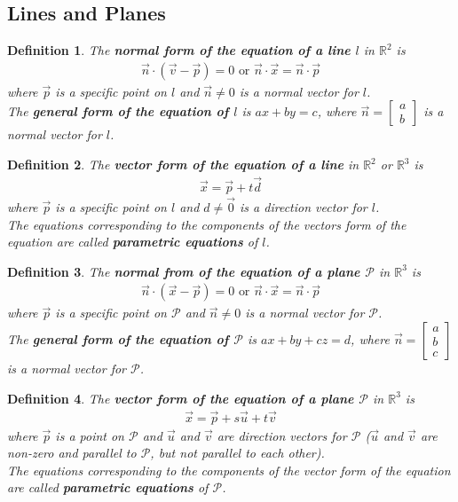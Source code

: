 \documentclass{article}
\theoremstyle{sltheorem}
\newtheorem{definition}{Definition}[section]
\begin{document}
\subsection{Lines and Planes}
\begin{definition}
    The \textbf{normal form of the equation of a line $l$} in $\mathbb{R}^2$ is
    \begin{gather*}
        \vec n \cdot (\vec v - \vec p) = 0 \text{  or  } \vec n \cdot \vec x = \vec n \cdot \vec p
    \end{gather*}
    where $\vec p$ is a specific point on $l$ and $\vec n \not= 0$ is a normal vector for $l$.\\
    The \textbf{general form of the equation of $l$} is $ax+by=c$, where $\vec n = \begin{bmatrix}
        a\\b    
    \end{bmatrix}$ is a normal vector for $l$.
\end{definition}
\begin{definition}
    The \textbf{vector form of the equation of a line} in $\mathbb{R}^2$ or $\mathbb{R}^3$ is
    \begin{gather*}
        \vec x = \vec p + t \vec d
    \end{gather*}
    where $\vec p$ is a specific point on $l$ and $d\not=\vec 0$ is a direction vector for $l$.\\
    The equations corresponding to the components of the vectors form of the equation are called \textbf{parametric equations} of $l$.
\end{definition}
\begin{definition}
    The \textbf{normal from of the equation of a plane $\mathcal{P}$} in $\mathbb{R}^3$ is
    \begin{gather*}
        \vec n \cdot (\vec x - \vec p) = 0 \text{  or  } \vec n \cdot \vec x = \vec n \cdot \vec p
    \end{gather*}
    where $\vec p$ is a specific point on $\mathcal{P}$ and $\vec n \not= 0$ is a normal vector for $\mathcal{P}$.\\
    The \textbf{general form of the equation of $\mathcal{P}$} is $ax + by + cz = d$, where $\vec n = \begin{bmatrix}
        a \\ b \\ c
    \end{bmatrix}$ is a normal vector for $\mathcal{P}$.
\end{definition}
\begin{definition}
    The \textbf{vector form of the equation of a plane $\mathcal{P}$} in $\mathbb{R}^3$ is
    \begin{gather*}
        \vec x = \vec p + s \vec u + t \vec v
    \end{gather*}
    where $\vec p$ is a point on $\mathcal{P}$ and $\vec u$ and $\vec v$ are direction vectors for $\mathcal{P}$ ($\vec u$ and $\vec v$ are non-zero and parallel to $\mathcal{P}$, but not parallel to each other).\\
    The equations corresponding to the components of the vector form of the equation are called \textbf{parametric equations} of $\mathcal{P}$.
\end{definition}
\end{document}
